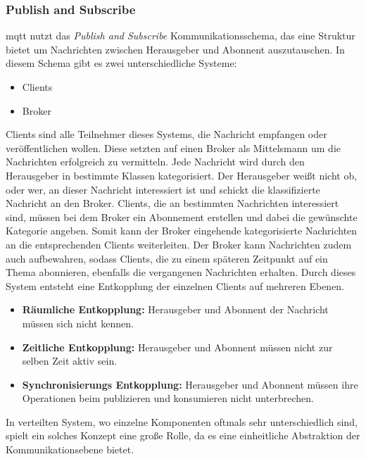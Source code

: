 \subsubsection{Publish and Subscribe} \label{s:publish-subscribe}
\ac{mqtt} nutzt das \textit{Publish and Subscribe} Kommunikationsschema, das eine Struktur bietet um Nachrichten zwischen Herausgeber und Abonnent auszutauschen. In diesem Schema gibt es zwei unterschiedliche Systeme:
\begin{itemize}
    \item Clients
    \item Broker
\end{itemize}
Clients sind alle Teilnehmer dieses Systems, die Nachricht empfangen oder veröffentlichen wollen. Diese setzten auf einen Broker als Mittelsmann um die Nachrichten erfolgreich zu vermitteln.\cite{teamGettingStartedMQTT} Jede Nachricht wird durch den Herausgeber in bestimmte Klassen kategorisiert. Der Herausgeber wei{\ss}t nicht ob, oder wer, an dieser Nachricht interessiert ist und schickt die klassifizierte Nachricht an den Broker. Clients, die an bestimmten Nachrichten interessiert sind, müssen bei dem Broker ein Abonnement erstellen und dabei die gewünschte Kategorie angeben. Somit kann der Broker eingehende kategorisierte Nachrichten an die entsprechenden Clients weiterleiten. Der Broker kann Nachrichten zudem auch aufbewahren, sodass Clients, die zu einem späteren Zeitpunkt auf ein Thema abonnieren, ebenfalls die vergangenen Nachrichten erhalten. Durch dieses System entsteht eine Entkopplung der einzelnen Clients auf mehreren Ebenen.\cite{EverythingYouNeed}
\begin{itemize}
    \item \textbf{Räumliche Entkopplung:} Herausgeber und Abonnent der Nachricht müssen sich nicht kennen.
    \item \textbf{Zeitliche Entkopplung:} Herausgeber und Abonnent müssen nicht zur selben Zeit aktiv sein.
    \item \textbf{Synchronisierungs Entkopplung:} Herausgeber und Abonnent müssen ihre Operationen beim publizieren und konsumieren nicht unterbrechen.
\end{itemize}
\cite{teamPublishSubscribeMQTT}
In verteilten System, wo einzelne Komponenten oftmals sehr unterschiedlich sind, spielt ein solches Konzept eine gro{\ss}e Rolle, da es eine einheitliche Abstraktion der Kommunikationsebene bietet.\cite{domingusDistributedSystemsIntroduction2020}
